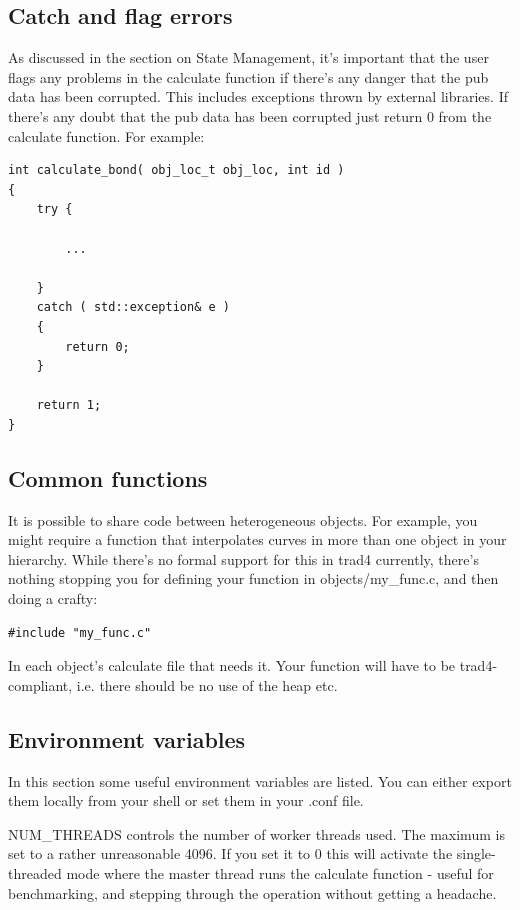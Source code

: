 \documentclass{report}
\begin{document}
\subsection{Catch and flag errors}

As discussed in the section on State Management, it's important that the user flags any problems in the calculate function if there's any danger that the pub data has been corrupted. This includes exceptions thrown by external libraries. If there's any doubt that the pub data has been corrupted just return 0 from the calculate function. For example:

\begin{verbatim}
int calculate_bond( obj_loc_t obj_loc, int id )
{
    try {

        ...

    }
    catch ( std::exception& e )
    {
        return 0;
    }

    return 1;
}
\end{verbatim}

\subsection{Common functions}
It is possible to share code between heterogeneous objects. For example, you might require a function that interpolates curves in more than one object in your hierarchy. While there's no formal support for this in trad4 currently, there's nothing stopping you for defining your function in objects/my_func.c, and then doing a crafty:

\begin{verbatim}
#include "my_func.c"
\end{verbatim}

In each object's calculate file that needs it. Your function will have to be trad4-compliant, i.e. there should be no use of the heap etc. 

\subsection{Environment variables}
In this section some useful environment variables are listed. You can either export them locally from your shell or set them in your .conf file.

NUM_THREADS controls the number of worker threads used. The maximum is set to a rather unreasonable 4096. If you set it to 0 this will activate the single-threaded mode where the master thread runs the calculate function - useful for benchmarking, and stepping through the operation without getting a headache.
\end{document}
